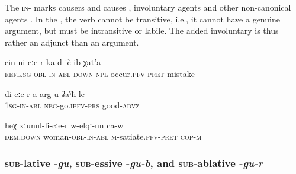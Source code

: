 The \textsc{in}- marks causers and causes , involuntary agents  and other non-canonical agents . In the , the verb cannot be transitive, i.e., it cannot have a genuine  argument, but must be intransitive or labile. The added involuntary  is thus rather an adjunct than an argument.
%
\begin{exe}
	\ex	\label{the mistakes that he made that happened through him}
	\gll	cin-ni-cːe-r	ka-d-ič-ib	χat'a \\
		\textsc{refl}.\textsc{sg}-\textsc{obl-in}-\textsc{abl}	\textsc{down}-\textsc{npl}-occur.\textsc{pfv}-\textsc{pret} mistake\\
	\glt	{}
	
	\ex	\label{I cannot do it well (lit. it will not go well from me}
	\gll	di-cːe-r	a-arg-u	ʡaˁħ-le \\
		1\textsc{sg-in}-\textsc{abl}	\textsc{neg}-go.\textsc{ipfv}-\textsc{prs}	good-\textsc{advz}\\
	\glt	{}
	
	\ex	\label{He had enough of his wife}
	\gll	heχ	xːunul-li-cːe-r	w-elqː-un ca-w \\
		\textsc{dem.down}	woman-\textsc{obl-in}-\textsc{abl}	\textsc{m}-satiate.\textsc{pfv}-\textsc{pret} \textsc{cop-m}\\
	\glt	{}
\end{exe}



\subsubsection{\textsc{sub}-lative -\textit{gu}, \textsc{sub}-essive -\textit{gu-b}, and \textsc{sub}-ablative -\textit{gu-r}}
\label{sssec:sub-lative -gu, sub-essive -gu-b, and sub-ablative -gu-r}

